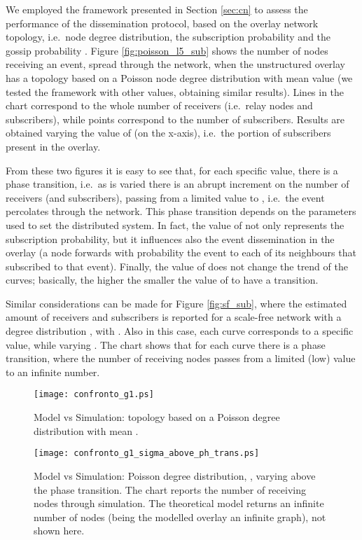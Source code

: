 \documentclass[10pt, conference, compsocconf]{IEEEtran}
\begin{document}
We employed the framework presented in Section \ref{sec:cn} to assess the performance of the dissemination protocol, based on the overlay network topology, i.e.~node degree distribution, the subscription probability  and the gossip probability . 
Figure \ref{fig:poisson_l5_sub} shows the number of nodes receiving an event, spread through the network, when the unstructured overlay has a topology based on a Poisson node degree distribution with mean value  (we tested the framework with other  values, obtaining similar results). 
Lines in the chart correspond to the whole number of receivers (i.e.~relay nodes and subscribers), while points correspond to the number of subscribers.
Results are obtained varying the value of  (on the x-axis), i.e.~the portion of subscribers present in the overlay.

From these two figures it is easy to see that, for each specific  value, there is a phase transition, i.e.~as  is varied there is an abrupt increment on the number of receivers (and subscribers), passing from a limited value to , i.e.~the event percolates through the network. 
This phase transition depends on the parameters used to set the distributed system. In fact, the value of  not only represents the subscription probability, but it influences also the event dissemination in the overlay (a node forwards with probability  the event to each of its neighbours that subscribed to that event).
Finally, the value of  does not change the trend of the curves; basically, the higher  the smaller the value of  to have a transition. 

Similar considerations can be made for Figure \ref{fig:sf_sub}, where the estimated amount of receivers and subscribers is reported for a scale-free network with a degree distribution , with . Also in this case, each curve corresponds to a specific  value, while varying . The chart shows that for each curve there is a phase transition, where the number of receiving nodes passes from a limited (low) value to an infinite number.



\begin{figure}[t]
   \centering
   \texttt{[image: confronto\_g1.ps]}
   \caption{Model vs Simulation: topology based on a Poisson degree distribution with mean .}
   \label{fig:confronto_g1}
\end{figure}

\begin{figure}[t]
   \centering
   \texttt{[image: confronto\_g1\_sigma\_above\_ph\_trans.ps]}
   \caption{Model vs Simulation: Poisson degree distribution, , varying  above the phase transition. The chart reports the number of receiving nodes through simulation. The theoretical model returns an infinite number of nodes (being the mo\-del\-led overlay an infinite graph), not shown here.}
   \label{fig:confronto_s_above}
\end{figure}
\end{document}
